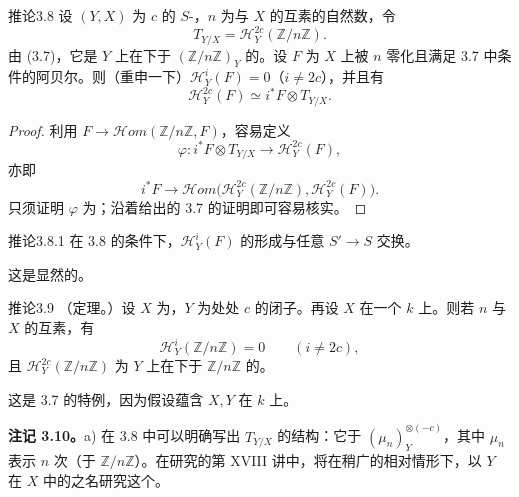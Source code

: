 \begin{SGAresult}{推论}{3.8}
设 $(Y,X)$ 为 $c$ 的 $S$-，$n$ 为与 $X$ 的互素的自然数，令
\[
T_{Y/X}=\mathcal H_Y^{2c}(\mathbb Z/n\mathbb Z).
\]
由 (3.7)，它是 $Y$ 上在下于 $(\mathbb Z/n\mathbb Z)_Y$ 的。设 $F$ 为 $X$ 上被 $n$ 零化且满足 3.7 中条件的阿贝尔。则（重申一下）$\mathcal H_Y^i(F)=0$（$i\ne2c$），并且有
\[
\mathcal H_Y^{2c}(F)\simeq i^*F\otimes T_{Y/X}.
\]
\end{SGAresult}
\begin{proof}
利用 $F\to\mathcal Hom(\mathbb Z/n\mathbb Z,F)$，容易定义
\[
\varphi:i^*F\otimes T_{Y/X}\longrightarrow\mathcal H_Y^{2c}(F),
\]
亦即
\[
i^*F\longrightarrow\mathcal Hom\bigl(\mathcal H_Y^{2c}(\mathbb Z/n\mathbb Z),\mathcal H_Y^{2c}(F)\bigr).
\]
只须证明 $\varphi$ 为；沿着给出的 3.7 的证明即可容易核实。
\end{proof}
\begin{SGAresult}{推论}{3.8.1}
在 3.8 的条件下，$\mathcal H_Y^i(F)$ 的形成与任意 $S'\to S$ 交换。
\end{SGAresult}
这是显然的。
\begin{SGAresult}{推论}{3.9}
（定理。）设 $X$ 为，$Y$ 为处处 $c$ 的闭子。再设 $X$ 在一个 $k$ 上。则若 $n$ 与 $X$ 的互素，有
\[
\mathcal H_Y^i(\mathbb Z/n\mathbb Z)=0\qquad(i\ne2c),
\]
且 $\mathcal H_Y^{2c}(\mathbb Z/n\mathbb Z)$ 为 $Y$ 上在下于 $\mathbb Z/n\mathbb Z$ 的。
\end{SGAresult}
这是 3.7 的特例，因为假设蕴含 $X,Y$ 在 $k$ 上。

\textbf{注记 3.10。}a) 在 3.8 中可以明确写出 $T_{Y/X}$ 的结构：它于 $(\mu_n)_Y^{\otimes(-c)}$，其中 $\mu_n$ 表示 $n$ 次（于 $\mathbb Z/n\mathbb Z$）。在研究的第 XVIII 讲中，将在稍广的相对情形下，以 $Y$ 在 $X$ 中的之名研究这个。

